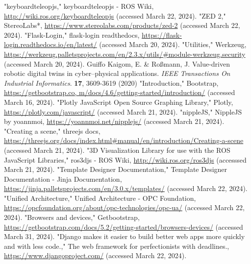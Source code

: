 \documentclass[conference]{IEEEtran}
\begin{document}
\begin{thebibliography}{00}
"keyboardteleopjs," keyboardteleopjs - ROS Wiki, \url{http://wiki.ros.org/keyboardteleopjs} (accessed March 22, 2024).
"ZED 2," StereoLabs*, \url{https://www.stereolabs.com/products/zed-2} (accessed March 22, 2024).
"Flask-Login," flask-login readthedocs, \url{https://flask-login.readthedocs.io/en/latest/} (accessed March 20, 2024).
"Utilities," Werkzeug, \url{https://werkzeug.palletsprojects.com/en/2.3.x/utils/#module-werkzeug.security} (accessed March 20, 2024).
Guiffo Kaigom, E. \& Roßmann, J. Value-driven robotic digital twins in cyber–physical applications. {\em IEEE Transactions On Industrial Informatics}. \textbf{17}, 3609-3619 (2020)
"Introduction," Bootstrap, \url{https://getbootstrap.co, m/docs/4.6/getting-started/introduction/} (accessed March 16, 2024).
"Plotly JavaScript Open Source Graphing Library," Plotly, \url{https://plotly.com/javascript/} (accessed March 21, 2024).
"nippleJS," NippleJS by yoannmoi, \url{https://yoannmoi.net/nipplejs/} (accessed March 21, 2024).
"Creating a scene," threejs docs, \url{https://threejs.org/docs/index.html#manual/en/introduction/Creating-a-scene} (accessed March 21, 2024).
"3D Visualization Library for use with the ROS JavaScript Libraries," ros3djs - ROS Wiki, \url{http://wiki.ros.org/ros3djs} (accesssed March 21, 2024).
"Template Designer Documentation," Template Designer Documentation - Jinja Documentation, \url{https://jinja.palletsprojects.com/en/3.0.x/templates/} (accessed March 22, 2024).
"Unified Architecture," Unified Architecture - OPC Foundation, \url{https://opcfoundation.org/about/opc-technologies/opc-ua/} (accessed March 22, 2024).
"Browsers and devices," Getbootstrap, \url{https://getbootstrap.com/docs/5.2/getting-started/browsers-devices/} (accessed March 31, 2024).
"Django makes it easier to build better web apps more quickly and with less code.," The web framework for perfectionists with deadlines., \url{https://www.djangoproject.com/} (accessed March 22, 2024).
\end{thebibliography}
\vspace{12pt}
\end{document}
